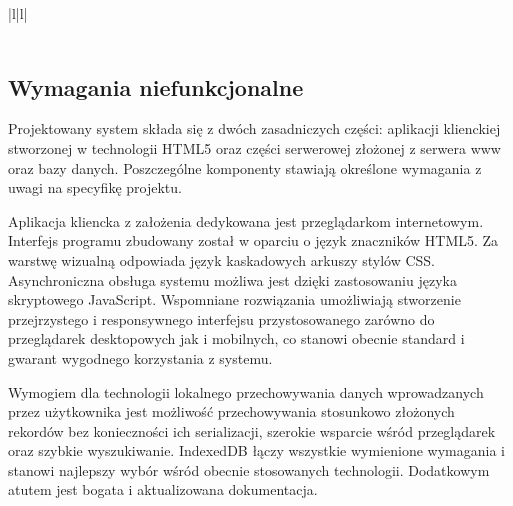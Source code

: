 \begin{table}[H]
\begin{tabular}{|l|l|}
	\\\hline
	\\ \hline
	\end{tabular}
	\caption{Przypadek użycia UC9: Wylogowanie użytkownika.}
\end{table}

\subsection{Wymagania niefunkcjonalne}
\label{sec:wymNieFunkcj}

Projektowany system składa się z dwóch zasadniczych części: aplikacji klienckiej stworzonej w technologii HTML5 oraz części serwerowej złożonej z serwera www oraz bazy danych. Poszczególne komponenty stawiają określone wymagania z uwagi na specyfikę projektu.

Aplikacja kliencka z założenia dedykowana jest przeglądarkom internetowym. Interfejs programu zbudowany został w oparciu o język znaczników HTML5. Za warstwę wizualną odpowiada język kaskadowych arkuszy stylów CSS. Asynchroniczna obsługa systemu możliwa jest dzięki zastosowaniu języka skryptowego JavaScript. Wspomniane rozwiązania umożliwiają stworzenie przejrzystego i responsywnego interfejsu przystosowanego zarówno do przeglądarek desktopowych jak i mobilnych, co stanowi obecnie standard i gwarant wygodnego korzystania z systemu.

Wymogiem dla technologii lokalnego przechowywania danych wprowadzanych przez użytkownika jest możliwość przechowywania stosunkowo złożonych rekordów bez konieczności ich serializacji, szerokie wsparcie wśród przeglądarek oraz szybkie wyszukiwanie. IndexedDB łączy wszystkie wymienione wymagania i stanowi najlepszy wybór wśród obecnie stosowanych technologii. Dodatkowym atutem jest bogata i aktualizowana dokumentacja.

